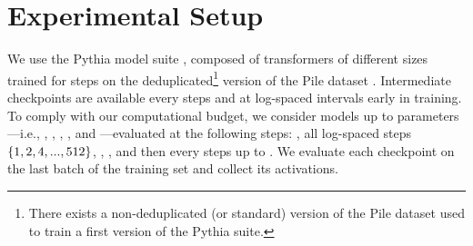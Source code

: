 


\section{Experimental Setup}\label{sec:experimental_setup}

We use the Pythia model suite \citep{biderman2023pythia}, composed of  transformers of different sizes trained for  steps on the deduplicated\footnote{There exists a non-deduplicated (or standard) version of the Pile dataset used to train a first version of the Pythia suite.} version of the Pile dataset \citep{gao2020pile}.
Intermediate checkpoints are available every  steps and at log-spaced intervals early in training.
To comply with our computational budget, we consider models up to  parameters---i.e., \sevenmil, \sixmil, \fourmil, \onebil, and \twobil---evaluated at the following steps: , all log-spaced steps $\{1, 2, 4, ..., 512\}$, , , and then every  steps up to .
We evaluate each checkpoint on the last batch of the training set and collect its activations.

